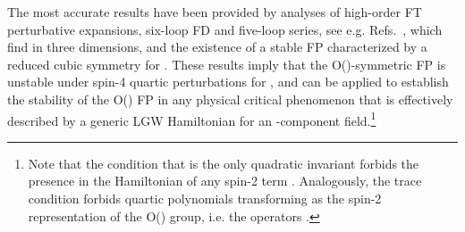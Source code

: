 \documentclass[a4paper,12pt]{article}
\def\spose#1{\hbox to 0pt{#1\hss}}
\def\ltapprox{\mathrel{\spose{\lower 3pt\hbox{\myHighlight{$\mathchar"218$}\coordHE{}}}
 \raise 2.0pt\hbox{\myHighlight{$\mathchar"13C$}\coordHE{}}}}
\begin{document}
The most accurate results have been provided by analyses of 
high-order FT perturbative expansions, six-loop FD 
and five-loop \myHighlight{$\epsilon$}\coordHE{} series, see e.g. Refs.~\cite{CPV-00,FHY-00},
which find \myHighlight{$N_c\ltapprox 2.9$}\coordHE{} in three dimensions, and the existence of 
a stable FP characterized by a reduced cubic symmetry for \coordHE{}.
These results imply that
the O(\coordHE{})-symmetric FP is unstable under spin-4 quartic perturbations 
for \coordHE{},
and can be applied to establish the stability of the O(\coordHE{}) FP
in any physical critical phenomenon that is effectively described
by a generic LGW Hamiltonian for an \coordHE{}-component 
field.\footnote{
Note that the condition that \coordHE{} is the only quadratic 
invariant forbids the presence in the Hamiltonian 
of any spin-2 term \coordHE{}. Analogously,
the trace condition \coordHE{}
forbids quartic polynomials transforming as the spin-2 
representation of the O(\coordHE{}) group, i.e. the operators \coordHE{}.}
\end{document}
